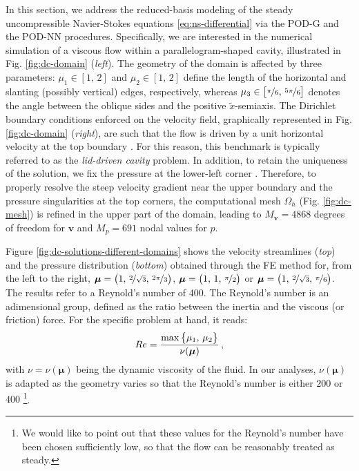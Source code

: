 \documentclass[12pt, a4paper, twoside, openright, notitlepage]{report}
\numberwithin{equation}{chapter}
\theoremstyle{theorem}
\theoremstyle{definition}
\theoremstyle{remark}
\theoremstyle{proposition}
\numberwithin{figure}{chapter}
\newcommand{\wt}[1]{\widetilde{#1}}
\newcommand{\bg}[1]{\boldsymbol{#1}}
\begin{document}
		In this section, we address the reduced-basis modeling of the steady uncompressible Navier-Stokes equations \eqref{eq:ns-differential} via the POD-G and the POD-NN procedures. Specifically, we are interested in the numerical simulation of a viscous flow within a parallelogram-shaped cavity, illustrated in Fig. \ref{fig:dc-domain} (\emph{left}). The geometry of the domain is affected by three parameters: $\mu_1 \in [1, \, 2]$ and $\mu_2 \in [1, \, 2]$ define the length of the horizontal and slanting (possibly vertical) edges, respectively, whereas $\mu_3 \in \big[ \nicefrac{\pi}{6}, \, \nicefrac{5 \pi}{6} \big]$ denotes the angle between the oblique sides and the positive $\wt{x}$-semiaxis. The Dirichlet boundary conditions enforced on the velocity field, graphically represented in Fig. \ref{fig:dc-domain} (\emph{right}), are such that the flow is driven by a unit horizontal velocity at the top boundary \cite{Per02}. For this reason, this benchmark is typically referred to as the \emph{lid-driven cavity} problem. In addition, to retain the uniqueness of the solution, we fix the pressure at the lower-left corner \cite{Dho14}. Therefore, to properly resolve the steep velocity gradient near the upper boundary and the pressure singularities at the top corners, the computational mesh $\Omega_h$ (Fig. \ref{fig:dc-mesh}) is refined in the upper part of the domain, leading to $M_{\bg{v}} = 4868$ degrees of freedom for $\bg{v}$ and $M_p = 691$ nodal values for $p$. 
		
		Figure \ref{fig:dc-solutions-different-domains} shows the velocity streamlines (\emph{top}) and the pressure distribution (\emph{bottom}) obtained through the FE method for, from the left to the right, $\bg{\mu} = \big( 1, \, \nicefrac{2}{\sqrt{3}}, \, \nicefrac{2 \pi}{3} \big)$, $\bg{\mu} = \big( 1, \, 1, \, \nicefrac{\pi}{2} \big)$ or $\bg{\mu} = \big( 1, \, \nicefrac{2}{\sqrt{3}}, \, \nicefrac{\pi}{6} \big)$. The results refer to a Reynold's number of $400$. The Reynold's number is an adimensional group, defined as the ratio between the inertia and the viscous (or friction) force. For the specific problem at hand, it reads:
		\begin{equation*}
			\vspace*{-0.1cm}
			Re = \dfrac{\max \big\lbrace \mu_1, \, \mu_2 \big\rbrace}{\nu(\bg{\mu})} \, ,
		\end{equation*}
		with $\nu = \nu(\bg{\mu})$ being the dynamic viscosity of the fluid. In our analyses, $\nu(\bg{\mu})$ is adapted as the geometry varies so that the Reynold's number is either $200$ or $400$ \vspace*{0.2cm} \footnote{We would like to point out that these values for the Reynold's number have been chosen sufficiently low, so that the flow can be reasonably treated as steady.}.
				
\end{document}
